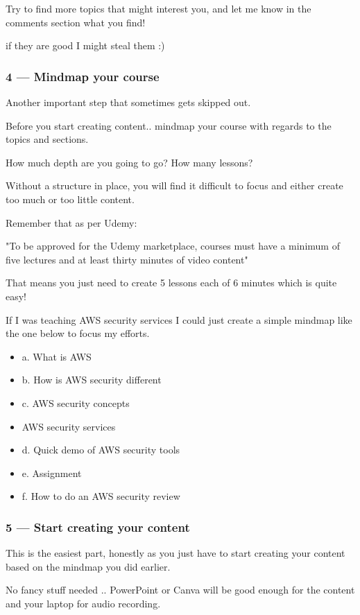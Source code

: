 \documentclass[11pt]{article}
\begin{document}
Try to find more topics that might interest you, and let me know in the comments section what you find!

if they are good I might steal them :)

\subsubsection*{4 — Mindmap your course}
Another important step that sometimes gets skipped out.

Before you start creating content.. mindmap your course with regards to the topics and sections.

How much depth are you going to go? How many lessons?

Without a structure in place, you will find it difficult to focus and either create too much or too little content.

Remember that as per Udemy:

"To be approved for the Udemy marketplace, courses must have a minimum of five lectures and at least thirty minutes of video content"

That means you just need to create 5 lessons each of 6 minutes which is quite easy!

If I was teaching AWS security services I could just create a simple mindmap like the one below to focus my efforts.

\begin{itemize}
\item a. What is AWS
\item b. How is AWS security different
\item c. AWS security concepts
\item AWS security services
\item d. Quick demo of AWS security tools
\item e. Assignment
\item f. How to do an AWS security review
\end{itemize}

\subsubsection*{5 — Start creating your content}
This is the easiest part, honestly as you just have to start creating your content based on the mindmap you did earlier.

No fancy stuff needed .. PowerPoint or Canva will be good enough for the content and your laptop for audio recording.
\end{document}
